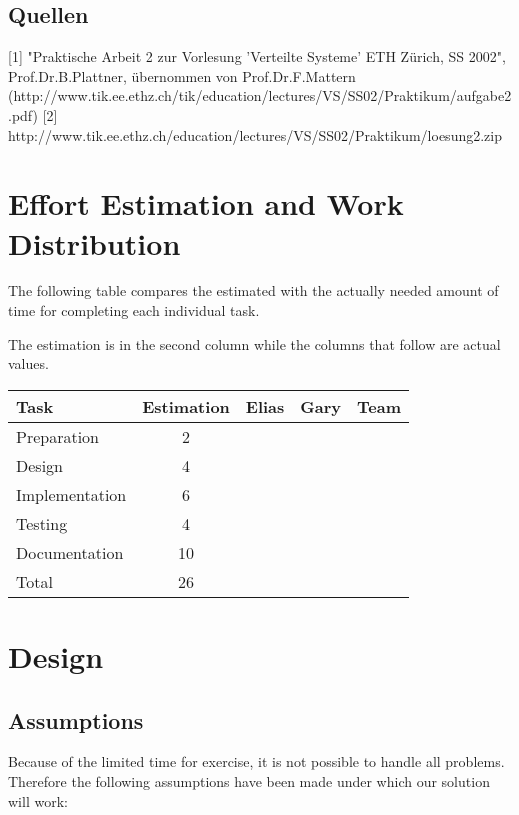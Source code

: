 \documentclass[11pt, a4paper]{article}
\begin{document}
\subsection{Quellen}

[1] "Praktische Arbeit 2 zur Vorlesung 'Verteilte Systeme' ETH Zürich, SS 2002", Prof.Dr.B.Plattner, übernommen von Prof.Dr.F.Mattern (http://www.tik.ee.ethz.ch/tik/education/lectures/VS/SS02/Praktikum/aufgabe2.pdf)
[2] http://www.tik.ee.ethz.ch/education/lectures/VS/SS02/Praktikum/loesung2.zip

\newpage

\section{Effort Estimation and Work Distribution}

The following table compares the estimated with the actually needed amount of time for completing each individual task.

The estimation is in the second column while the columns that follow are actual values.

\parskip 12pt
\begin{tabular} {| l | c | c | c | c |}
	\hline
	Task					&	Estimation		& 	Elias 	& 	Gary 	& 	Team	\\ \hline \hline
	Preparation				&	2				&			&  			&			\\ \hline
	Design					&	4				&			&			&			\\ \hline
	Implementation			&	6				&			&			& 	 		\\ \hline
	Testing					&	4				&			& 	 		& 	 		\\ \hline
	Documentation			&	10				&			&	 		& 			\\ \hline 
	Total					&	26				&			&			& 			\\
	\hline
\end{tabular}

\section{Design}

\subsection{Assumptions}

Because of the limited time for exercise, it is not possible to handle all problems. Therefore the following assumptions have been made under which our solution will work:
\end{document}
